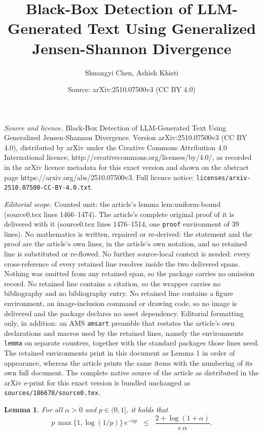 \documentclass[10pt,a4paper]{amsart}
\title{Black-Box Detection of LLM-Generated Text Using Generalized Jensen-Shannon Divergence}
\author{Shuangyi Chen, Ashish Khisti}
\date{Source: arXiv:2510.07500v3 (CC BY 4.0)}
\newtheorem{lemma}{Lemma}
\begin{document}
\maketitle

\noindent\emph{Source and licence.} Black-Box Detection of LLM-Generated Text Using Generalized Jensen-Shannon Divergence. Version arXiv:2510.07500v3 (CC BY 4.0), distributed by arXiv under the Creative Commons Attribution 4.0 International licence, http://creativecommons.org/licenses/by/4.0/, as recorded in the arXiv licence metadata for this exact version and shown on the abstract page https://arxiv.org/abs/2510.07500v3. Full licence notice: \texttt{licenses/arxiv-2510.07500-CC-BY-4.0.txt}.\par\smallskip

\noindent\textit{Editorial scope.} Counted unit: the article's lemma lem:uniform-bound (source0.tex lines 1466--1474). The article's complete original proof of it is delivered with it (source0.tex lines 1476--1514, one \texttt{proof} environment of 39 lines). No mathematics is written, repaired or re-derived: the statement and the proof are the article's own lines, in the article's own notation, and no retained line is substituted or re-flowed.  No further source-local context is needed: every cross-reference of every retained line resolves inside the two delivered spans.  Nothing was omitted from any retained span, so the package carries no omission record.  No retained line contains a citation, so the wrapper carries no bibliography and no bibliography entry.  No retained line contains a figure environment, an image-inclusion command or drawing code, so no image is delivered and the package declares no asset dependency.  Editorial formatting only, in addition: an AMS \texttt{amsart} preamble that restates the article's own declarations and macros used by the retained lines, namely the environments \texttt{lemma} on separate counters, together with the standard packages those lines need.  The retained environments print in this document as Lemma 1 in order of appearance, whereas the article prints the same items with the numbering of its own full document.  The complete native source of the article as distributed in the arXiv e-print for this exact version is bundled unchanged as \texttt{sources/186678/source0.tex}.
\begin{lemma}
\label{lem:uniform-bound}
For all $\alpha > 0$ and $p \in (0,1]$, it holds that
\begin{equation}
  p \, \max\{1, \log(1/p)\} \, e^{-\alpha p}
  \;\;\le\;\; \frac{2 + \log(1+\alpha)}{e\,\alpha}.
  \label{eq:uniform-ineq}
\end{equation}
\end{lemma}
\end{document}
